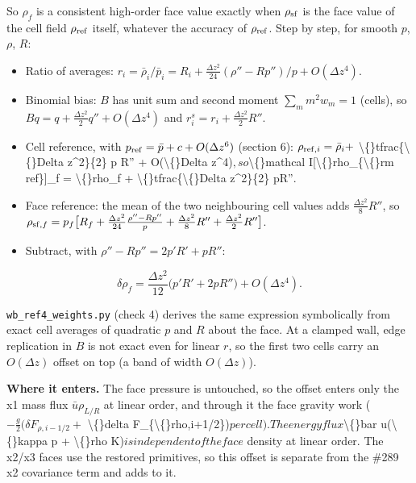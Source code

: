 \documentclass[11pt,a4paper]{article}
\begin{document}
So $\rho_f$ is a consistent high-order face value exactly when $\rho_{\rm sf}$ is the face value of the cell
field $\rho_{\rm ref}$ itself, whatever the accuracy of $\rho_{\rm ref}$. Step by step, for smooth $p$, $\rho$, $R$:

\begin{itemize}
\item Ratio of averages: $r_i = \bar\rho_i/\bar p_i = R_i + \tfrac{\Delta z^2}{24}(\rho'' - R p'')/p + O(\Delta z^4)$.
\item Binomial bias: $B$ has unit sum and second moment $\sum_m m^2 w_m = 1$ (cells), so
  $B q = q + \tfrac{\Delta z^2}{2} q'' + O(\Delta z^4)$ and $r^s_i = r_i + \tfrac{\Delta z^2}{2}R''$.
\item Cell reference, with $p_{\rm ref} = \bar p + c + O(\Delta z^6)$ (section 6): $\rho_{{\rm ref},i} = \bar\rho_i +$
  \textbackslash\{\}tfrac\{\textbackslash\{\}Delta z\textasciicircum{}2\}\{2\} p R'' + O(\textbackslash\{\}Delta z\textasciicircum{}4)$, so $\textbackslash\{\}mathcal I[\textbackslash\{\}rho\_\{\textbackslash\{\}rm ref\}]\_f = \textbackslash\{\}rho\_f + \textbackslash\{\}tfrac\{\textbackslash\{\}Delta z\textasciicircum{}2\}\{2\} pR''$.$
\item Face reference: the mean of the two neighbouring cell values adds $\tfrac{\Delta z^2}{8}R''$, so
  $\rho_{{\rm sf},f} = p_f\big[R_f + \tfrac{\Delta z^2}{24}\tfrac{\rho'' - Rp''}{p} + \tfrac{\Delta z^2}{8}R'' + \tfrac{\Delta z^2}{2}R''\big]$.
\item Subtract, with $\rho'' - Rp'' = 2p'R' + pR''$:
\end{itemize}

\begin{equation*}
\delta\rho_f = \frac{\Delta z^2}{12}\big(p'R' + 2pR''\big) + O(\Delta z^4).
\end{equation*}

\texttt{wb\_ref4\_weights.py} (check 4) derives the same expression symbolically from exact cell averages of
quadratic $p$ and $R$ about the face. At a clamped wall, edge replication in $B$ is not exact even for linear
$r$, so the first two cells carry an $O(\Delta z)$ offset on top (a band of width $O(\Delta z)$).

\textbf{Where it enters.} The face pressure is untouched, so the offset enters only the x1 mass flux
$\bar u\rho_{L/R}$ at linear order, and through it the face gravity work ($-\tfrac g2(\delta F_{\rho,i-1/2} +$
\textbackslash\{\}delta F\_\{\textbackslash\{\}rho,i+1/2\})$ per cell). The energy flux $\textbackslash\{\}bar u(\textbackslash\{\}kappa p + \textbackslash\{\}rho K)$ is independent of the face$
density at linear order. The x2/x3 faces use the restored primitives, so this offset is separate from the
\#289 x2 covariance term and adds to it.
\end{document}
